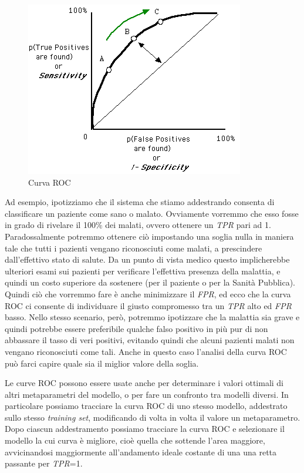 \begin{figure}[tbp]
\centering
  \includegraphics[width=0.5 \textwidth]{images/ROC}
  \caption{Curva ROC}
  \label{fig:ROC}
\end{figure}

Ad esempio, ipotizziamo che il sistema che stiamo addestrando consenta di classificare un paziente come sano o malato. Ovviamente vorremmo che esso fosse in grado di rivelare il 100\% dei malati, ovvero ottenere un \emph{TPR} pari ad 1. Paradossalmente potremmo ottenere ciò impostando una soglia nulla in maniera tale che tutti i pazienti vengano riconosciuti come malati, a prescindere dall'effettivo stato di salute. Da un punto di vista medico questo implicherebbe ulteriori esami sui pazienti per verificare l'effettiva presenza della malattia, e quindi un costo superiore da sostenere (per il paziente o per la Sanità Pubblica). Quindi ciò che vorremmo fare è anche minimizzare il \emph{FPR}, ed ecco che la curva ROC ci consente di individuare il giusto compromesso tra un \emph{TPR} alto ed \emph{FPR} basso. 
Nello stesso scenario, però, potremmo ipotizzare che la malattia sia grave e quindi potrebbe essere preferibile qualche falso positivo in più pur di non abbassare il tasso di veri positivi, evitando quindi che alcuni pazienti malati non vengano riconosciuti come tali. Anche in questo caso l'analisi della curva ROC può farci capire quale sia il miglior valore della soglia.

Le curve ROC possono essere usate anche per determinare i valori ottimali di altri metaparametri del modello, o per fare un confronto tra modelli diversi. In particolare possiamo tracciare la curva ROC di uno stesso modello, addestrato sullo stesso \emph{training set}, modificando di volta in volta il valore un metaparametro. Dopo ciascun addestramento possiamo tracciare la curva ROC e selezionare il modello la cui curva è migliore, cioè quella che sottende l'area maggiore, avvicinandosi maggiormente all'andamento ideale costante di una una retta passante per \emph{TPR}=1. 